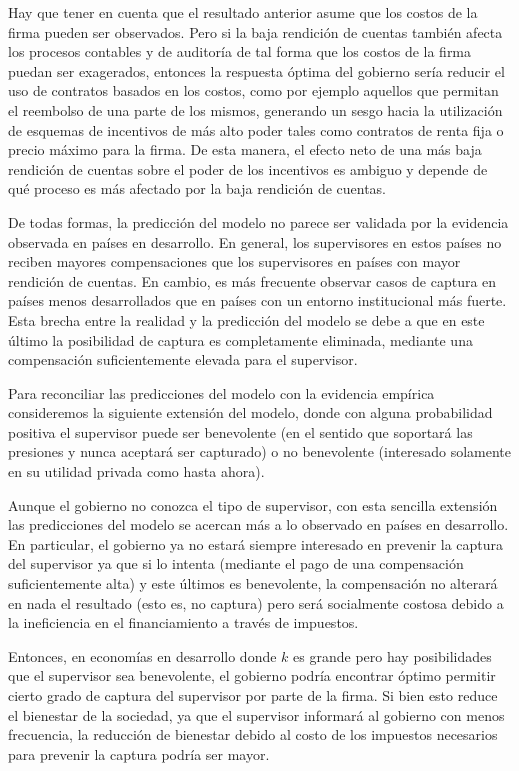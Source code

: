 \documentclass[
  12pt,
  spanish,
]{book}
\begin{document}
Hay que tener en cuenta que el resultado anterior asume que los costos de la firma pueden ser observados. Pero si la baja rendición de cuentas también afecta los procesos contables y de auditoría de tal forma que los costos de la firma puedan ser exagerados, entonces la respuesta óptima del gobierno sería reducir el uso de contratos basados en los costos, como por ejemplo aquellos que permitan el reembolso de una parte de los mismos, generando un sesgo hacia la utilización de esquemas de incentivos de más alto poder tales como contratos de renta fija o precio máximo para la firma. De esta manera, el efecto neto de una más baja rendición de cuentas sobre el poder de los incentivos es ambiguo y depende de qué proceso es más afectado por la baja rendición de cuentas.

De todas formas, la predicción del modelo no parece ser validada por la evidencia observada en países en desarrollo. En general, los supervisores en estos países no reciben mayores compensaciones que los supervisores en países con mayor rendición de cuentas. En cambio, es más frecuente observar casos de captura en países menos desarrollados que en países con un entorno institucional más fuerte. Esta brecha entre la realidad y la predicción del modelo se debe a que en este último la posibilidad de captura es completamente eliminada, mediante una compensación suficientemente elevada para el supervisor.

Para reconciliar las predicciones del modelo con la evidencia empírica consideremos la siguiente extensión del modelo, donde con alguna probabilidad positiva el supervisor puede ser benevolente (en el sentido que soportará las presiones y nunca aceptará ser capturado) o no benevolente (interesado solamente en su utilidad privada como hasta ahora).

Aunque el gobierno no conozca el tipo de supervisor, con esta sencilla extensión las predicciones del modelo se acercan más a lo observado en países en desarrollo. En particular, el gobierno ya no estará siempre interesado en prevenir la captura del supervisor ya que si lo intenta (mediante el pago de una compensación suficientemente alta) y este últimos es benevolente, la compensación no alterará en nada el resultado (esto es, no captura) pero será socialmente costosa debido a la ineficiencia en el financiamiento a través de impuestos.

Entonces, en economías en desarrollo donde \(k\) es grande pero hay posibilidades que el supervisor sea benevolente, el gobierno podría encontrar óptimo permitir cierto grado de captura del supervisor por parte de la firma. Si bien esto reduce el bienestar de la sociedad, ya que el supervisor informará al gobierno con menos frecuencia, la reducción de bienestar debido al costo de los impuestos necesarios para prevenir la captura podría ser mayor.
\end{document}
